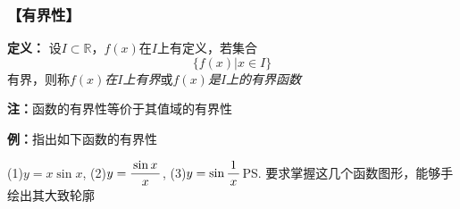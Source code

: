 \subsubsection{【有界性】}			

{{\bf 定义：}}
	设$I\subset\mathbb{R}$，$f(x)$在$I$上有定义，若集合
	$$\{f(x)|x\in I\}$$
	有界，则称{\it $f(x)$在$I$上有界}或{\it $f(x)$是$I$上的有界函数}
		
	{\bf 注：}函数的有界性等价于其值域的有界性

	{{\bf 例：}指出如下函数的有界性}
	
		\quad(1)\;$y=x\sin x$,\hspace{5em} (2)\;$y=\displaystyle\frac{\,{\sin x}\,}{\,{x}\,}$,
		\hspace{5em} (3)\;$y=\sin\displaystyle\frac{\,{1}\,}{\,{x}\,}$\ps{要求掌握这几个函数图形，能够手绘出其大致轮廓}
	
	\begin{center}

\end{center}
